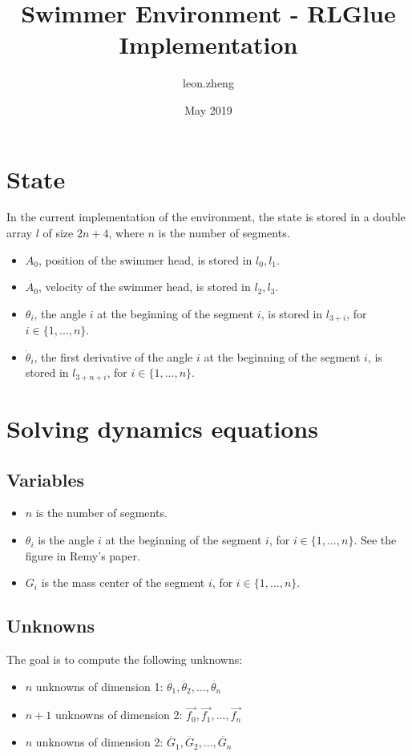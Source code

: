 \documentclass{article}
\title{Swimmer Environment - RLGlue Implementation}
\author{leon.zheng }
\date{May 2019}
\begin{document}
\maketitle

\section{State}

In the current implementation of the environment, the state is stored in a double array $l$ of size $2n+4$, where $n$ is the number of segments.
\begin{itemize}
    \item $A_0$, position of the swimmer head, is stored in $l_0, l_1$.
    \item $\dot{A_0}$, velocity of the swimmer head, is stored in $l_2, l_3$.
    \item $\theta_i$, the angle $i$ at the beginning of the segment $i$, is stored in $l_{3+i}$, for $i \in \{1, ..., n\}$.
    \item $\dot{\theta}_i$, the first derivative of the angle $i$ at the beginning of the segment $i$, is stored in $l_{3+n+i}$, for $i \in \{1, ..., n\}$.
\end{itemize}

\section{Solving dynamics equations}

\subsection{Variables}
\begin{itemize}
    \item $n$ is the number of segments.
    \item $\theta_i$ is the angle $i$ at the beginning of the segment $i$, for $i \in \{1, ..., n\}$. See the figure in Remy's paper.
    \item $G_i$ is the mass center of the segment $i$, for $i \in \{1, ..., n\}$.
\end{itemize}

\subsection{Unknowns}
The goal is to compute the following unknowns:
\begin{itemize}
  \item $n$ unknowns of dimension 1: $\ddot{\theta_1}, \ddot{\theta_2}, ... , \ddot{\theta_n}$
  \item $n+1$ unknowns of dimension 2: $\vec{f_0}, \vec{f_1}, ..., \vec{f_n}$
  \item $n$ unknowns of dimension 2: $\ddot{G_1}, \ddot{G_2}, ..., \ddot{G_n}$
\end{itemize}
\end{document}
